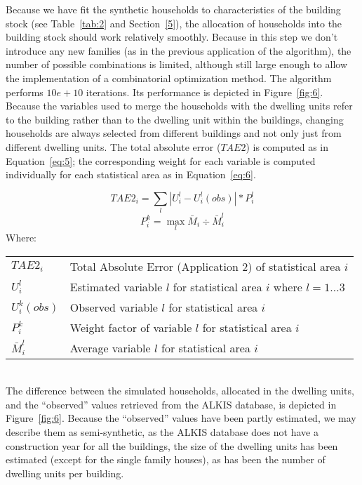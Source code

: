 \documentclass[11pt]{IJM-article}
\begin{document}
Because we have fit the synthetic households to characteristics of the building
stock (see Table~\ref{tab:2} and Section~\ref{5}), the allocation of households
into the building stock should work relatively smoothly. Because in this step
we don't introduce any new families (as in the previous application of the
algorithm), the number of possible combinations is limited, although still
large enough to allow the implementation of a combinatorial optimization
method. The algorithm performs $10e+10$ iterations. Its performance is depicted
in Figure~\ref{fig:6}. Because the variables used to merge the households with
the dwelling units refer to the building rather than to the dwelling unit
within the buildings, changing households are always selected from different
buildings and not only just from different dwelling units. The total absolute
error ($TAE2$) is computed as in Equation~\ref{eq:5}; the corresponding weight
for each variable is computed individually for each statistical area as in
Equation~\ref{eq:6}.

\parbox{\textwidth}{ 
    \begin{equation} 
    \label{eq:5} 
        TAE2_i = \sum_{l} |U_i^{l} - U_i^{l}(obs)| * P^l_i 
    \end{equation} 
    \begin{equation}
    \label{eq:6} 
        P^k_i = \max_l{\bar{M}_i} \div \bar{M}^l_i 
    \end{equation}
    \noindent Where:\\ 
    \begin{tabular}{lp{15cm}} 
        $TAE2_i$ & Total Absolute Error (Application 2) of statistical
            area $i$ \\ 
        $U_i^{l}$ & Estimated variable $l$ for statistical area $i$ where 
            $l = 1 \dots 3$ \\ 
        $U_i^{k}(obs)$ & Observed variable $l$ for statistical area $i$ \\ 
        $P_i^k$ & Weight factor of variable $l$ for statistical area $i$\\ 
        $\bar{M}^l_i$ & Average variable $l$ for statistical area $i$ 
    \end{tabular} 
}\\ 

The difference between the simulated households, allocated in the dwelling
units, and the ``observed'' values retrieved from the ALKIS database, is
depicted in Figure~\ref{fig:6}. Because the ``observed'' values have been
partly estimated, we may describe them as semi-synthetic, as the ALKIS database
does not have a construction year for all the buildings, the size of the
dwelling units has been estimated (except for the single family houses), as has
been the number of dwelling units per building.
\end{document}
